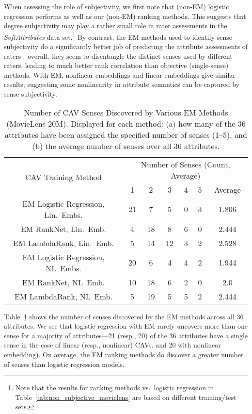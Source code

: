\documentclass[manuscript,screen,nonacm]{acmart}
\newcommand{\1}{{\mathbf 1}}
\theoremstyle{TheoremNum}
\begin{document}
When assessing the role of subjectivity, we first note that (non-EM) logistic regression performs as well as our (non-EM)
ranking methods. This suggests that degree subjectivity may play a rather small role in rater assessments in the \emph{SoftAttributes} data set.\footnote{Note that the results for ranking methods vs.\ logistic regression in Table~\ref{tab:non_subjective_movielens} are based on different training/test sets.}
By contrast, the EM methods used to identify sense subjectivity do a significantly better job of predicting the attribute assessments of raters---overall, they seem to disentangle the distinct senses used by different raters, leading to much better rank correlation than objective (single-sense) methods. With EM, nonlinear embeddings and linear embeddings give similar results, suggesting some nonlinearity in attribute semantics can be captured by sense subjectivity.
%
\begin{table}[t]
\begin{tabular}{|c||c|c|c|c|c|c|} \hline
\multirow{2}{*}{CAV Training Method}& \multicolumn{6}{c|}{Number of Senses (Count, Average)}\\ \cline{2-7}
& 1 & 2 & 3 & 4 & 5 & Average \\ \hline\hline
EM Logistic Regression, Lin.\ Embs. & 21 & 7 & 5 & 0 & 3 & 1.806 \\ \hline
EM RankNet, Lin.\ Emb. & 4 & 18 & 8 & 6 & 0 & 2.444 \\ \hline
EM LambdaRank, Lin.\ Emb. & 5 & 14 & 12 & 3 & 2 & 2.528 \\ \hline
EM Logistic Regression, NL\ Embs. & 20 & 6 & 4 & 4 & 2 & 1.944 \\ \hline
EM RankNet, NL\ Emb. & 10 & 18 & 6 & 2 & 0 & 2.0 \\ \hline
EM LambdaRank, NL\ Emb. & 5 & 19 & 5 & 5 & 2 & 2.444 \\ \hline
\end{tabular}
\vspace*{2mm}
\caption{Number of CAV Senses Discovered by Various EM Methods (MovieLens 20M). Displayed for each method: (a) how many of the 36 attributes have been assigned the specified number of senses (1--5), and (b) the average number of senses over all 36 attributes.}
\label{tab:sense_stats_movielens}
\end{table}
%
Table~\ref{tab:sense_stats_movielens} shows the number of senses discovered by the EM methods across all 36 attributes.  We see that logistic regression with EM rarely uncovers more than one sense for a majority of attributes---21 (resp., 20) of the 36 attributes have a single sense in the case of linear (resp., nonlinear) CAVs. and 20 with nonlinear embedding). On average, the EM ranking methods do discover a greater number of senses than logistic regression models.
\end{document}
